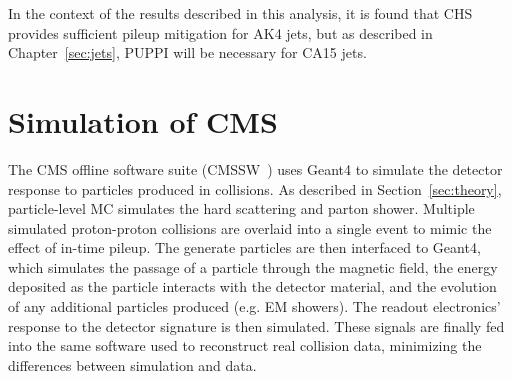 In the context of the results described in this analysis, it is found that CHS provides sufficient pileup mitigation for AK4 jets, but as described in Chapter~\ref{sec:jets}, PUPPI will be necessary for CA15 jets. 

\section{Simulation of CMS}
\label{sec:cms:sim}

The CMS offline software suite (CMSSW~\cite{cmssw}) uses Geant4 \cite{geant1,geant2} to simulate the detector response to particles produced in collisions. 
As described in Section~\ref{sec:theory}, particle-level MC simulates the hard scattering and  parton shower.
Multiple simulated proton-proton collisions are overlaid into a single event to mimic the effect of in-time pileup. 
The generate particles are then interfaced to Geant4, which simulates the passage of a particle through the magnetic field, the energy deposited as the particle interacts with the detector material, and the evolution of any additional particles produced (e.g. EM showers).
The readout electronics' response to the detector signature is then simulated.
These signals are finally fed into the same software used to reconstruct real collision data, minimizing the differences between simulation and data. 

